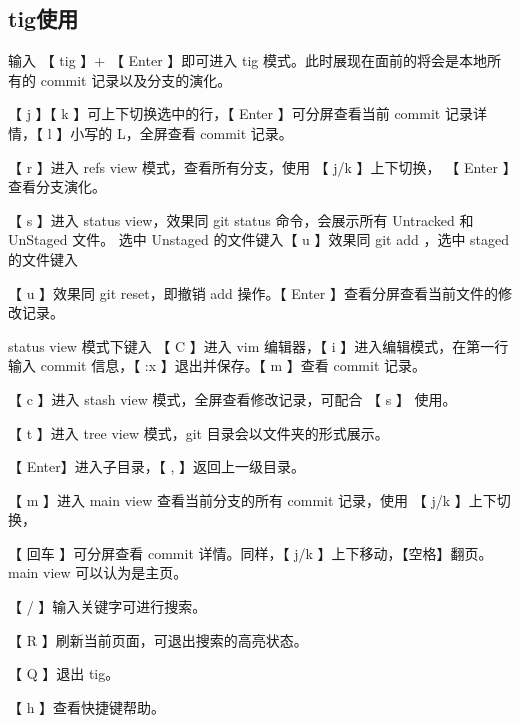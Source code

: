 \subsection{tig使用}
输入 【 tig 】+ 【 Enter 】即可进入 tig 模式。此时展现在面前的将会是本地所有的 commit 记录以及分支的演化。

【 j 】【 k 】可上下切换选中的行，【 Enter 】可分屏查看当前 commit 记录详情，【 l 】小写的 L，全屏查看 commit 记录。

【 r 】进入 refs view 模式，查看所有分支，使用 【 j/k 】上下切换， 【 Enter 】查看分支演化。

【 s 】进入 status view，效果同 git status 命令，会展示所有 Untracked 和 UnStaged 文件。 选中 Unstaged 的文件键入【 u 】效果同 git add ，选中 staged 的文件键入

【 u 】效果同 git reset，即撤销 add 操作。【 Enter 】查看分屏查看当前文件的修改记录。

status view 模式下键入 【 C 】进入 vim 编辑器，【 i 】进入编辑模式，在第一行输入 commit 信息，【 :x 】退出并保存。【 m 】查看 commit 记录。

【 c 】进入 stash view 模式，全屏查看修改记录，可配合 【 s 】 使用。

【 t 】进入 tree view 模式，git 目录会以文件夹的形式展示。

【 Enter】进入子目录，【 , 】返回上一级目录。

【 m 】进入 main view 查看当前分支的所有 commit 记录，使用 【 j/k 】上下切换，

【 回车 】可分屏查看 commit 详情。同样，【 j/k 】上下移动，【空格】翻页。
main view 可以认为是主页。

【 / 】输入关键字可进行搜索。

【 R 】刷新当前页面，可退出搜索的高亮状态。

【 Q 】退出 tig。

【 h 】查看快捷键帮助。
